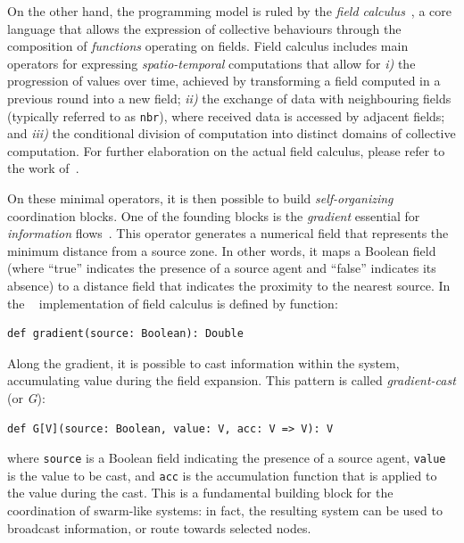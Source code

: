 On the other hand, the programming model is ruled by the \emph{field calculus}~\cite{DBLP:conf/saso/ViroliBDP15,DBLP:journals/tocl/AudritoVDPB19},  
 a core language that allows the expression of collective behaviours through the composition of \emph{functions} operating on fields.
%
Field calculus includes main operators for expressing \emph{spatio-temporal} computations that allow for 
\emph{i)} the progression of values over time, achieved by transforming a field computed in a previous round into a new field; 
\emph{ii)} the exchange of data with neighbouring fields (typically referred to as \lstinline|nbr|), where received data is accessed by adjacent fields; and 
\emph{iii)} the conditional division of computation into distinct domains of collective computation. 
%
For further elaboration on the actual field calculus, please refer to the work of~\cite{DBLP:journals/jlap/ViroliBDACP19}.

On these minimal operators, 
 it is then possible to build \emph{self-organizing} coordination blocks.
 One of the founding blocks is the \emph{gradient} essential for 
 \emph{information} flows~\cite{DBLP:conf/saso/WolfH07}.
%
This operator generates a numerical field that represents the minimum distance from a source zone. 
%
In other words, it maps a Boolean field (where ``true'' indicates the presence of a source agent and ``false'' indicates its absence) to a distance field that indicates the proximity to the nearest source. 
%
In the \scafi{}~\cite{casadei2022scafi} implementation of field calculus is defined by function:
\begin{lstlisting}
def gradient(source: Boolean): Double
\end{lstlisting}
Along the gradient, it is possible to cast information within the system, accumulating value during the field expansion. 
This pattern is called \emph{gradient-cast} (or \emph{G}):
\begin{lstlisting}
def G[V](source: Boolean, value: V, acc: V => V): V
\end{lstlisting}
where \texttt{source} is a Boolean field indicating the presence of a source agent, 
 \texttt{value} is the value to be cast, and 
 \texttt{acc} is the accumulation function that is applied to the value during the cast.
%
This is a fundamental building block for the coordination of swarm-like systems: in fact, the resulting system can be used to broadcast information, or route towards selected nodes.

